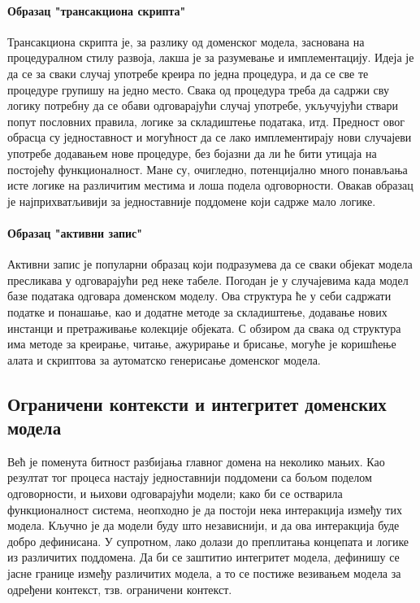 \documentclass[12pt,oneside]{memoir}
\begin{document}
\paragraph{Образац "трансакциона скрипта"}
Трансакциона скрипта је, за разлику од доменског модела, заснована на процедуралном стилу развоја, лакша је за разумевање и имплементацију. Идеја је да се за сваки случај употребе креира по једна процедура, и да се све те процедуре групишу на једно место. Свака од процедура треба да садржи сву логику потребну да се обави одговарајући случај употребе, укључујући ствари попут пословних правила, логике за складиштење података, итд. Предност овог обрасца су једноставност и могућност да се лако имплементирају нови случајеви употребе додавањем нове процедуре, без бојазни да ли ће бити утицаја на постојећу функционалност. Мане су, очигледно, потенцијално много понављања исте логике на различитим местима и лоша подела одговорности. Овакав образац је најприхватљивији за једноставније поддомене који садрже мало логике.

\paragraph{Образац "активни запис"}
Активни запис је популарни образац који подразумева да се сваки објекат модела пресликава у одговарајући ред неке табеле. Погодан је у случајевима када модел базе података одговара доменском моделу. Ова структура ће у себи садржати податке и понашање, као и додатне методе за складиштење, додавање нових инстанци и претраживање колекције објеката. С обзиром да свака од структура има методе за креирање, читање, ажурирање и брисање, могуће је коришћење алата и скриптова за аутоматско генерисање доменског модела.

\subsection{Ограничени контексти и интегритет доменских модела}\label{ogranicenikonteksti}
Већ је поменута битност разбијања главног домена на неколико мањих. Као резултат тог процеса настају једноставнији поддомени са бољом поделом одговорности, и њихови одговарајући модели; како би се остварила функционалност система, неопходно је да постоји нека интеракција између тих модела. Кључно је да модели буду што независнији, и да ова интеракција буде добро дефинисана. У супротном, лако долази до преплитања концепата и логике из различитих поддомена. Да би се заштитио интегритет модела, дефинишу се јасне границе између различитих модела, а то се постиже везивањем модела за одређени контекст, тзв. ограничени контекст.
\end{document}
